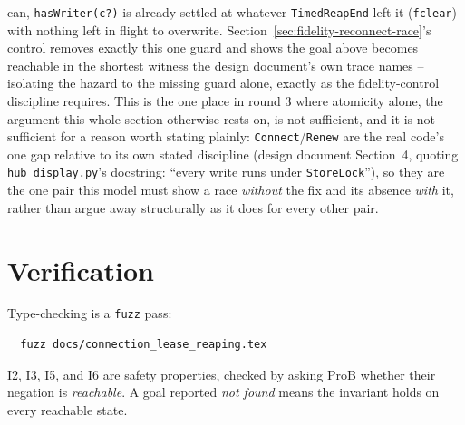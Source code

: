 \documentclass[a4paper,10pt,fleqn]{article}
\begin{document}
can, \texttt{hasWriter(c?)} is already settled at whatever
\texttt{TimedReapEnd} left it (\texttt{fclear}) with nothing left in
flight to overwrite. Section~\ref{sec:fidelity-reconnect-race}'s control
removes exactly this one guard and shows the goal above becomes reachable
in the shortest witness the design document's own trace names -- isolating
the hazard to the missing guard alone, exactly as the fidelity-control
discipline requires. This is the one place in round 3 where atomicity
alone, the argument this whole section otherwise rests on, is not
sufficient, and it is not sufficient for a reason worth stating plainly:
\texttt{Connect}/\texttt{Renew} are the real code's one gap relative to
its own stated discipline (design document Section~4, quoting
\texttt{hub\_display.py}'s docstring: ``every write runs under
\texttt{StoreLock}''), so they are the one pair this model must show a
race \emph{without} the fix and its absence \emph{with} it, rather than
argue away structurally as it does for every other pair.

\section{Verification}
\label{sec:verify}

Type-checking is a \texttt{fuzz} pass:
\begin{verbatim}
  fuzz docs/connection_lease_reaping.tex
\end{verbatim}

I2, I3, I5, and I6 are safety properties, checked by asking ProB whether
their negation is \emph{reachable}. A goal reported \emph{not found} means
the invariant holds on every reachable state.
\end{document}

